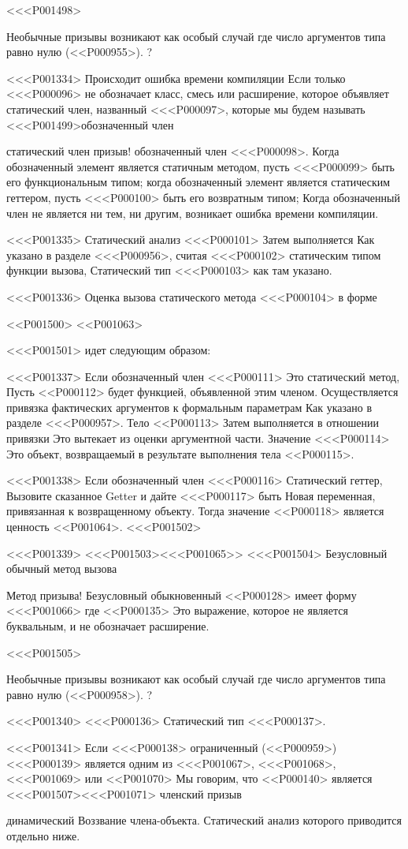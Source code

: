 {{{{{{<<<P001498>{%
Необычные призывы возникают как особый случай
где число аргументов типа равно нулю (<<P000955>).%
?

<<<P001334>%
Происходит ошибка времени компиляции
Если только <<<P000096> не обозначает класс, смесь или расширение, которое объявляет
статический член, названный <<<P000097>,
которые мы будем называть
<<<P001499>{обозначенный член}{статический член призыв! обозначенный член
<<<P000098>.
Когда обозначенный элемент является статичным методом, пусть <<<P000099> быть его функциональным типом;
когда обозначенный элемент является статическим геттером, пусть <<<P000100> быть его возвратным типом;
Когда обозначенный член не является ни тем, ни другим, возникает ошибка времени компиляции.

<<<P001335>%
Статический анализ <<<P000101> Затем выполняется
Как указано в разделе <<<P000956>,
считая <<<P000102> статическим типом функции вызова,
Статический тип <<<P000103> как там указано.

<<<P001336>%
Оценка вызова статического метода <<<P000104> в форме

<<P001500>
<<P001063>

<<<P001501>
идет следующим образом:

<<<P001337>%
Если обозначенный член <<<P000111> Это статический метод,
Пусть <<P000112> будет функцией, объявленной этим членом.
Осуществляется привязка фактических аргументов к формальным параметрам
Как указано в разделе <<<P000957>.
Тело <<P000113> Затем выполняется в отношении привязки
Это вытекает из оценки аргументной части.
Значение <<<P000114> Это объект, возвращаемый в результате выполнения тела <<P000115>.

<<<P001338>%
Если обозначенный член <<<P000116> Статический геттер,
Вызовите сказанное Getter и дайте <<<P000117> быть
Новая переменная, привязанная к возвращенному объекту.
Тогда значение <<P000118> является ценность
<<P001064>.
<<<P001502>

<<<P001339>%
<<<P001503><<<P001065>>
<<<P001504> Безусловный обычный метод вызова {%
Метод призыва! Безусловный обыкновенный
<<P000128> имеет форму
<<<P001066>
где <<P000135> Это выражение, которое не является буквальным,
и не обозначает расширение.

<<<P001505>{%
Необычные призывы возникают как особый случай
где число аргументов типа равно нулю (<<P000958>).%
?

<<<P001340>%
<<<P000136> Статический тип <<<P000137>.

<<<P001341>%
Если <<<P000138> \DYNAMIC ограниченный
(<<P000959>)
<<<P000139> является одним из
<<<P001067>, <<<P001068>, <<<P001069> или <<P001070>
Мы говорим, что <<P000140> является
<<<P001507><<<P001071> членский призыв {
динамический Воззвание члена-объекта.
Статический анализ которого приводится отдельно ниже.

}}}}}}}}}}}
